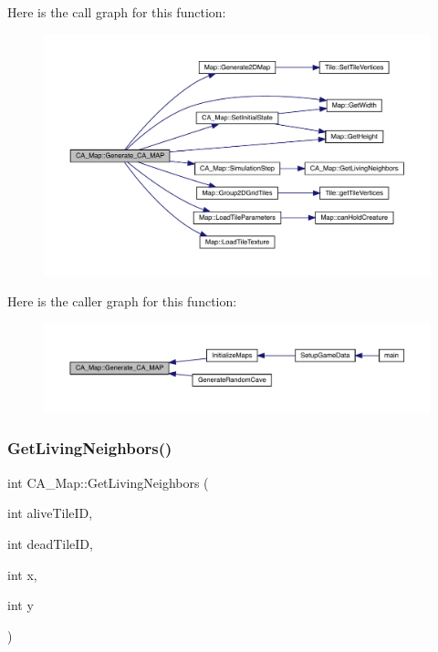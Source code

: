 Here is the call graph for this function\+:
\nopagebreak
\begin{figure}[H]
\begin{center}
\leavevmode
\includegraphics[width=350pt]{class_c_a___map_a8db5cbcb8cef56f0ac58571425502b59_cgraph}
\end{center}
\end{figure}
Here is the caller graph for this function\+:
\nopagebreak
\begin{figure}[H]
\begin{center}
\leavevmode
\includegraphics[width=350pt]{class_c_a___map_a8db5cbcb8cef56f0ac58571425502b59_icgraph}
\end{center}
\end{figure}
\mbox{\label{class_c_a___map_ad57529f17a77b590fe93839c4b8bd5f9}} 
\subsubsection{\texorpdfstring{Get\+Living\+Neighbors()}{GetLivingNeighbors()}}
{\footnotesize\ttfamily int C\+A\+\_\+\+Map\+::\+Get\+Living\+Neighbors (\begin{DoxyParamCaption}\item[{int}]{alive\+Tile\+ID,  }\item[{int}]{dead\+Tile\+ID,  }\item[{int}]{x,  }\item[{int}]{y }\end{DoxyParamCaption})}

